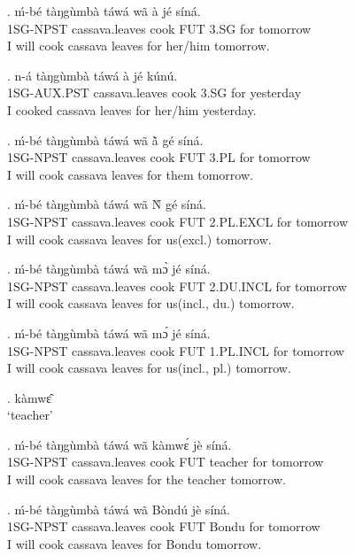 \documentclass{assets/fieldnotes}
\begin{document}
\exg. ḿ-bé tàŋgùmbà táwá wã à jé síná.\\
    1SG-NPST cassava.leaves cook FUT 3.SG for tomorrow\\
    I will cook cassava leaves for her/him tomorrow.

\exg. n-á tàŋgùmbà táwá à jé kúnú.\\
    1SG-AUX.PST cassava.leaves cook 3.SG for yesterday\\
    I cooked cassava leaves for her/him yesterday.

\exg. ḿ-bé tàŋgùmbà táwá wã à̃ gé síná.\\
    1SG-NPST cassava.leaves cook FUT 3.PL for tomorrow\\
    I will cook cassava leaves for them tomorrow. \label{3PL beneficiary}

\exg. ḿ-bé tàŋgùmbà táwá wã Ǹ gé síná.\\
    1SG-NPST cassava.leaves cook FUT 2.PL.EXCL for tomorrow\\
    I will cook cassava leaves for us(excl.) tomorrow.

\exg. ḿ-bé tàŋgùmbà táwá wã mɔ̀ jé síná.\\
    1SG-NPST cassava.leaves cook FUT 2.DU.INCL for tomorrow\\
    I will cook cassava leaves for us(incl., du.) tomorrow.

\exg. ḿ-bé tàŋgùmbà táwá wã mɔ́ jé síná.\\
    1SG-NPST cassava.leaves cook FUT 1.PL.INCL for tomorrow\\
    I will cook cassava leaves for us(incl., pl.) tomorrow.

\ex. kàmwɛ̂\\
    `teacher'

\exg. ḿ-bé tàŋgùmbà táwá wã kàmwɛ́ jè síná.\\
    1SG-NPST cassava.leaves cook FUT teacher for tomorrow\\
    I will cook cassava leaves for the teacher tomorrow.

\exg. ḿ-bé tàŋgùmbà táwá wã Bòndú jè síná.\\
    1SG-NPST cassava.leaves cook FUT Bondu for tomorrow\\
    I will cook cassava leaves for Bondu tomorrow.
\end{document}
